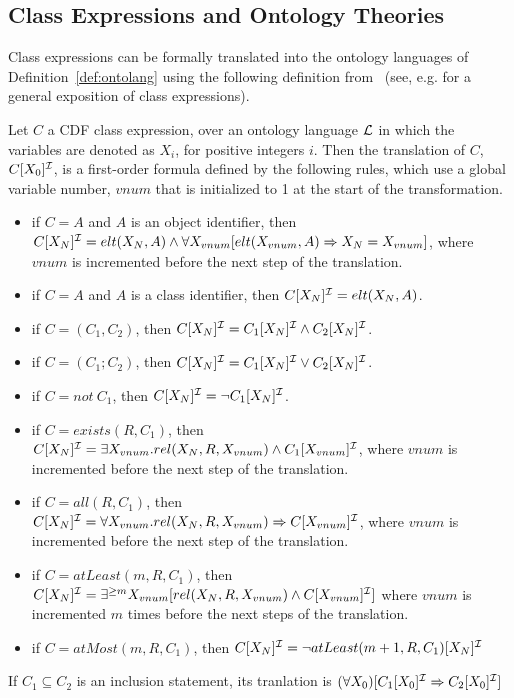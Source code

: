 \subsection{Class Expressions and Ontology Theories} \label{sec:cesemantics}

Class expressions can be formally translated into the ontology
languages of Definition~\ref{def:ontolang} using the
following definition from~\cite{Swif03}  (see, e.g. \cite{CGLN02}
for a general exposition of class expressions).

\begin{definition} \label{def:fot}
Let $C$ a CDF class expression, over an ontology language ${\cal L}$ in
which the variables are denoted as $X_i$, for positive integers $i$.
Then the translation of $C$, $C[X_0]^{{\cal I}}$, is a first-order formula
defined by the following rules, which use a global variable number,
$vnum$ that is initialized to 1 at the start of the transformation.

\begin{itemize}
\item if $C = A$ and  $A$ is an object identifier, then  $C[X_N]^{{\cal I}} =
  elt(X_N,A) \wedge \forall X_{vnum} [elt(X_{vnum},A) \Rightarrow X_N = X_{vnum}]$, 
	where $vnum$ is incremented before the next step of the translation.
%
\item if $C = A$ and  $A$ is a class identifier, then  $C[X_N]^{{\cal I}} =
		elt(X_N,A)$.
%
%
\item if $C = (C_1 , C_2)$, then $C[X_N]^{{\cal I}} =
		C_1[X_N]^{{\cal I}} \wedge C_2[X_N]^{{\cal I}}$.
%
\item if $C = (C_1 ; C_2)$, then $C[X_N]^{{\cal I}} =
		C_1[X_N]^{{\cal I}} \vee C_2[X_N]^{{\cal I}}$.
%
\item if $C = not\ C_1$, then $C[X_N]^{{\cal I}} = \neg C_1[X_N]^{{\cal I}}$.
%
\item if $C = exists(R,C_1)$, then $C[X_N]^{{\cal I}} =
		\exists X_{vnum}. rel(X_N,R,X_{vnum}) \wedge
		C_1[X_{vnum}]^{{\cal I}}$, where $vnum$ is
			incremented before the	next step of the translation.
%
\item if $C = all(R,C_1)$, then $C[X_N]^{{\cal I}} = 
	\forall X_{vnum}. rel(X_N,R,X_{vnum}) \Rightarrow C[X_{vnum}]^{{\cal I}}$,
	where $vnum$ is incremented before the next step of the translation.
%

\item if $C = atLeast(m,R,C_1)$, then $C[X_N]^{{\cal I}} = 
\exists^{\geq m} X_{vnum} [rel(X_N,R,X_{vnum}) \wedge C[X_{vnum}]^{{\cal I}}]
$		
where $vnum$ is incremented $m$ times before the next steps of the
translation. 
%
\item if $C  = atMost(m,R,C_1)$, then 
	$C[X_N]^{{\cal I}} = \neg atLeast(m+1,R,C_1)[X_N]^{{\cal I}}$

\end{itemize}
If $C_1 \subseteq C_2$ is an inclusion statement, its tranlation is 
$
(\forall X_0) [ C_1[X_0]^{{\cal I}} \Rightarrow C_2[X_0]^{{\cal I}} ]
$
\end{definition}

